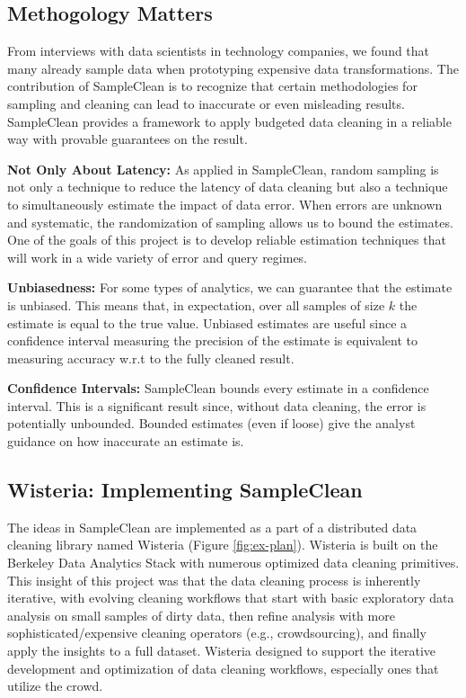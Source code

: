 \subsection{Methogology Matters}
From interviews with data scientists in technology companies, we found that many already sample data when prototyping expensive data transformations.
The contribution of SampleClean is to recognize that certain methodologies for sampling and cleaning can lead to inaccurate or even misleading results.
SampleClean provides a framework to apply budgeted data cleaning in a reliable way with provable guarantees on the result.

\vspace{0.5em}
\noindent\textbf{Not Only About Latency: } As applied in SampleClean, random sampling is not only a technique to reduce the latency of data cleaning but also a technique to simultaneously estimate the impact of data error.
When errors are unknown and systematic, the randomization of sampling allows us to bound the estimates.
One of the goals of this project is to develop reliable estimation techniques that will work in a wide variety of error and query regimes.

\vspace{0.5em}
\noindent\textbf{Unbiasedness: } For some types of analytics, we can guarantee that the estimate is unbiased. This means that, in expectation, over all samples of size $k$ the estimate is equal to the true value. Unbiased estimates are useful since a confidence interval measuring the precision of the estimate is equivalent to measuring accuracy w.r.t to the fully cleaned result.

\vspace{0.5em}
\noindent\textbf{Confidence Intervals: } SampleClean bounds every estimate in a confidence interval. This is a significant result since, without data cleaning, the error is potentially unbounded. Bounded estimates (even if loose) give the analyst guidance on how inaccurate an estimate is.

\subsection{Wisteria: Implementing SampleClean \cite{haas2015wisteria}}
The ideas in SampleClean are implemented as a part of a distributed data cleaning library named Wisteria (Figure \ref{fig:ex-plan}).
Wisteria is built on the Berkeley Data Analytics Stack with numerous optimized data cleaning primitives.
This insight of this project was that the data cleaning process is inherently iterative, with evolving cleaning workflows that 
start with basic exploratory data analysis on small samples of dirty data, then refine analysis with 
more sophisticated/expensive cleaning operators (e.g., crowdsourcing), and finally apply the insights to a full dataset.
Wisteria designed to support the iterative development and optimization of data cleaning workflows, especially ones that utilize the crowd.

